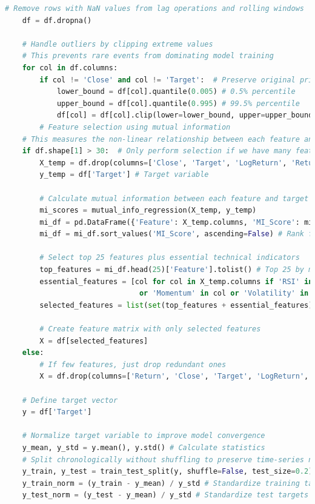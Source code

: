 \documentclass[12pt]{article}
\begin{document}
\begin{lstlisting}[language=Python]
    # Remove rows with NaN values from lag operations and rolling windows
    df = df.dropna()
    
    # Handle outliers by clipping extreme values
    # This prevents rare events from dominating model training
    for col in df.columns:
        if col != 'Close' and col != 'Target':  # Preserve original price and target
            lower_bound = df[col].quantile(0.005) # 0.5% percentile
            upper_bound = df[col].quantile(0.995) # 99.5% percentile
            df[col] = df[col].clip(lower=lower_bound, upper=upper_bound) # Trim outliers
        # Feature selection using mutual information
    # This measures the non-linear relationship between each feature and target
    if df.shape[1] > 30:  # Only perform selection if we have many features
        X_temp = df.drop(columns=['Close', 'Target', 'LogReturn', 'Return']) # Candidate features
        y_temp = df['Target'] # Target variable
        
        # Calculate mutual information between each feature and target
        mi_scores = mutual_info_regression(X_temp, y_temp)
        mi_df = pd.DataFrame({'Feature': X_temp.columns, 'MI_Score': mi_scores})
        mi_df = mi_df.sort_values('MI_Score', ascending=False) # Rank features by information content
        
        # Select top 25 features plus essential technical indicators
        top_features = mi_df.head(25)['Feature'].tolist() # Top 25 by mutual information
        essential_features = [col for col in X_temp.columns if 'RSI' in col or 'MACD' in col 
                               or 'Momentum' in col or 'Volatility' in col] # Key technical indicators
        selected_features = list(set(top_features + essential_features)) # Combine lists, remove duplicates
        
        # Create feature matrix with only selected features
        X = df[selected_features]
    else:
        # If few features, just drop redundant ones
        X = df.drop(columns=['Return', 'Close', 'Target', 'LogReturn', 'Log_Return'])
    
    # Define target vector
    y = df['Target']

    # Normalize target variable to improve model convergence
    y_mean, y_std = y.mean(), y.std() # Calculate statistics
    # Split chronologically without shuffling to preserve time-series nature
    y_train, y_test = train_test_split(y, shuffle=False, test_size=0.2) 
    y_train_norm = (y_train - y_mean) / y_std # Standardize training targets
    y_test_norm = (y_test - y_mean) / y_std # Standardize test targets using same parameters


\end{lstlisting}
\end{document}
